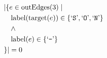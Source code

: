 \begin{align*}
&|\{e \in \mathrm{outEdges}(3)  \mid \\
&\quad \mathrm{label}(\mathrm{target}(e)) \in \{ \text{`\texttt{S}'},  \text{`\texttt{O}'},  \text{`\texttt{N}'} \}\\
&\quad \wedge\\
&\quad \mathrm{label}(e) \in \{ \text{`\texttt{-}'} \}\\
&\}| = 0
\end{align*}

